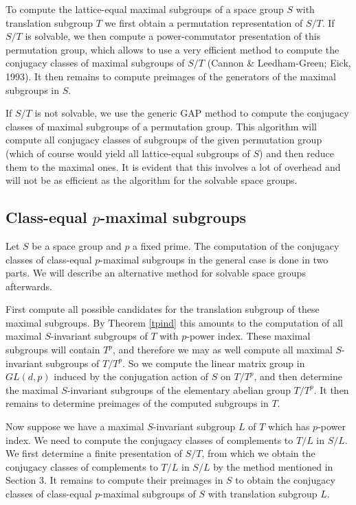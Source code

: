 \documentclass[12pt]{amsart}
\newcommand{\GAP}{{\sf GAP}}
\begin{document}
To compute the lattice-equal maximal subgroups of a space group $S$
with translation subgroup $T$ we first obtain a permutation
representation of $S/T$. If $S/T$ is solvable, we then compute a 
power-commutator presentation of this permutation group, which 
allows to use a very efficient method to compute the conjugacy 
classes of maximal subgroups of $S/T$ (Cannon \& Leedham-Green; 
Eick, 1993). It then remains to compute preimages of the generators  
of the maximal subgroups in $S$. 

If $S/T$ is not solvable, we use the generic {\GAP} method to 
compute the conjugacy classes of  maximal subgroups of a permutation
group. This algorithm will compute all conjugacy classes of subgroups
of the given permutation group (which of course would yield all 
lattice-equal subgroups of $S$) and then reduce them to the maximal 
ones. It is evident that this involves a lot of overhead and will 
not be as efficient as the algorithm for the solvable space groups.

\subsection{Class-equal $p$-maximal subgroups}
\label{ssclas}

Let $S$ be a space group and $p$ a fixed prime. The computation of the 
conjugacy classes of class-equal $p$-maximal subgroups in the general
case is done in two parts. We will describe an alternative method for
solvable space groups afterwards. 

First compute all possible candidates for the translation subgroup 
of these maximal subgroups. By Theorem \ref{tpind} this amounts to 
the computation of all maximal $S$-invariant subgroups of $T$ with 
$p$-power index. These maximal subgroups will contain $T^p$, and
therefore we may as well compute all maximal $S$-invariant subgroups
of $T / T^p$. So we compute the linear matrix group in $GL(d, p)$
induced by the conjugation action of $S$ on $T / T^p$, and then 
determine the maximal $S$-invariant subgroups of the elementary 
abelian group $T / T^p$. It then remains to determine preimages of 
the computed subgroups in $T$.

Now suppose we have a maximal  $S$-invariant subgroup $L$ of $T$
which has $p$-power index. We need to compute the conjugacy
classes of complements to $T / L$ in $S / L$. We first determine 
a finite presentation of $S / T$, from which we obtain the conjugacy 
classes of complements to $T / L$ in $S / L$ by the method mentioned 
in Section 3. It remains to compute their preimages in $S$ to obtain 
the conjugacy classes of class-equal $p$-maximal subgroups of $S$ with
translation subgroup $L$.
\end{document}
